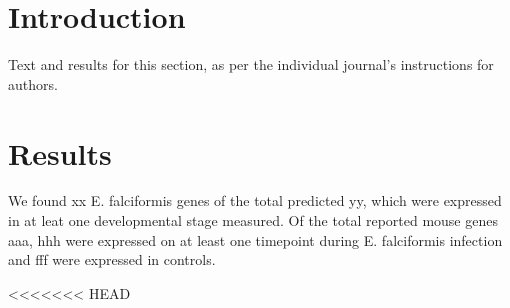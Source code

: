 \documentclass{bmcart}
\begin{document}



\section*{Introduction}
Text and results for this section, as per the individual journal's instructions for authors. 


  \section*{Results}

We found xx E. falciformis genes of the total predicted yy, which were expressed in at leat one developmental stage measured.
Of the total reported mouse genes aaa, hhh were expressed on at least one timepoint during E. falciformis infection and fff were expressed in controls.  

<<<<<<< HEAD
\end{document}
